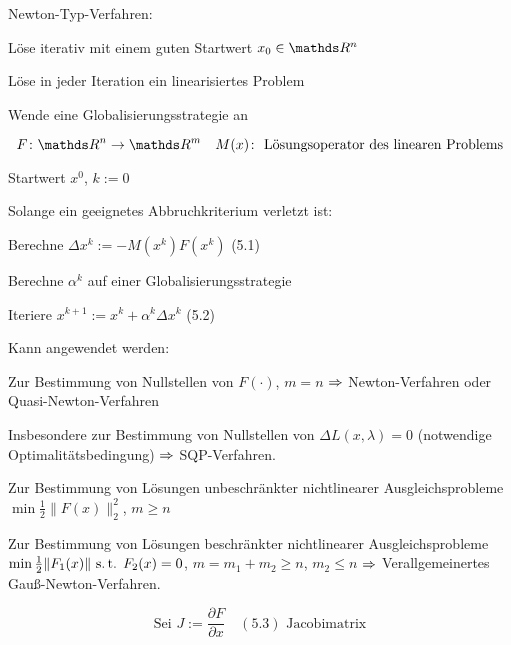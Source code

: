 

Newton-Typ-Verfahren:

\bitm
\item Löse iterativ mit einem guten Startwert $x_0 \in \R^n$
\item Löse in jeder Iteration ein linearisiertes Problem
\item Wende eine Globalisierungsstrategie an
\eitm

\[ F\colon \R^n \to \R^m \quad M(x)\colon \text{ Lösungsoperator des linearen Problems} \]


\bitm
\item Startwert $x^0$, $k := 0$
\item Solange ein geeignetes Abbruchkriterium verletzt ist:
\bitm
	\item Berechne $\Delta x^k := - M(x^k) F(x^k)$ (5.1)
	\item Berechne $\alpha^k$ auf einer Globalisierungsstrategie
	\item Iteriere $x^{k+1} := x^k + \alpha^k \Delta x^k$ (5.2)
\eitm
\eitm

Kann angewendet werden:

\bitm
\item Zur Bestimmung von Nullstellen von $F(\cdot)$, $m=n$ $\Rightarrow$ Newton-Verfahren oder Quasi-Newton-Verfahren
\item Insbesondere zur Bestimmung von Nullstellen von $\Delta L(x,\lambda) = 0$ (notwendige Optimalitätsbedingung) $\Rightarrow$ SQP-Verfahren.
\item Zur Bestimmung von Lösungen unbeschränkter nichtlinearer Ausgleichsprobleme $\min \frac 12 \|F(x)\|_2^2$, $m \geq n$
\item Zur Bestimmung von Lösungen beschränkter nichtlinearer Ausgleichsprobleme $\min \frac 12 \|F_1(x)\| \text{ s.\,t. } F_2(x) = 0$, $m = m_1+m_2 \geq n$, $m_2 \leq n$ $\Rightarrow$ Verallgemeinertes Gauß-Newton-Verfahren.
\eitm

\[ \text{Sei } J := \frac{\partial F}{\partial x} \quad (5.3) \text{ Jacobimatrix} \]


